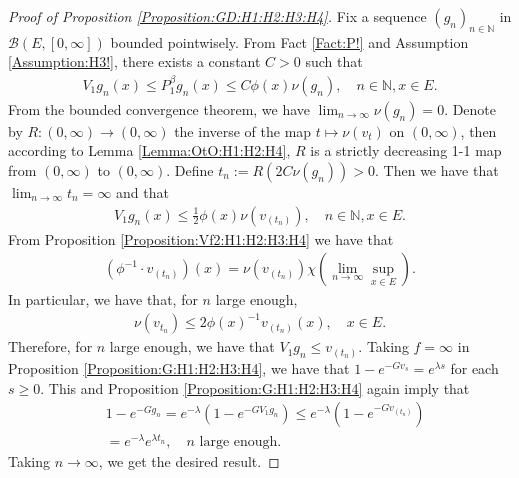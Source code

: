 \documentclass[12pt,a4paper]{amsart}
\numberwithin{equation}{section}
\theoremstyle{plain}
\theoremstyle{definition}
\theoremstyle{remark}
\begin{document}
\begin{proof}[Proof of Proposition \ref{Proposition:GD:H1:H2:H3:H4}]
Fix a sequence $(g_{n})_{n\in \mathbb N}$ in $\mathcal B(E,[0,\infty])$ bounded pointwisely. 
From Fact \ref{Fact:P!} and Assumption \ref{Assumption:H3!}, there exists a constant $C > 0$ such that 
\begin{align}
V_1 g_n(x) \leq P^\beta_1 g_n(x) \leq C \phi(x) \nu(g_n),
\quad n \in \mathbb N, x\in E.
\end{align}
From the bounded convergence theorem, we have $\lim_{n\to \infty}\nu(g_n) =0$.
Denote by $R:(0,\infty) \to (0,\infty)$ the inverse of the map $t \mapsto \nu(v_t)$ on $(0,\infty)$, then according to Lemma \ref{Lemma:OtO:H1:H2:H4}, $R$ is a strictly decreasing 1-1 map from $(0,\infty)$ to $(0,\infty)$. 
Define $t_n:= R(2C\nu(g_n))> 0$.
Then we have that $\lim_{n\to \infty} t_n = \infty$ and that 
\begin{align}
V_1 g_n(x) \leq \frac{1}{2} \phi(x) \nu(v_{(t_n)}), 
\quad n \in \mathbb N, x\in E.
\end{align}
From Proposition \ref{Proposition:Vf2:H1:H2:H3:H4} we have that
\begin{align}
(\phi^{-1} \cdot v_{(t_n)})(x) 
= \nu(v_{(t_n)}) \chi(\lim_{n\to \infty} \sup_{x\in E}).
\end{align}
In particular, we have that, for $n$ large enough,
\begin{align}
\nu(v_{t_n}) \leq 2 \phi(x)^{-1} v_{(t_n)}(x), 
\quad x\in E.
\end{align}
Therefore, for $n$ large enough, we have that $V_1g_n \leq v_{(t_n)}$.
Taking $f = \infty$ in Proposition \ref{Proposition:G:H1:H2:H3:H4}, we have that $1 - e^{- Gv_s} = e^{\lambda s}$ for each $s\geq 0$.
This and Proposition \ref{Proposition:G:H1:H2:H3:H4} again imply that
\begin{align}
& 1 - e^{- Gg_n}
= e^{- \lambda} (1- e^{- GV_1g_n})
\leq e^{- \lambda} (1- e^{- G v_{(t_n)}}) 
\\& = e^{- \lambda} e^{\lambda t_n},
\quad \text{$n$ large enough.}
\end{align} 
Taking $n\to \infty$, we get the desired result.
\end{proof}
\appendix
\section{}
\end{document}
